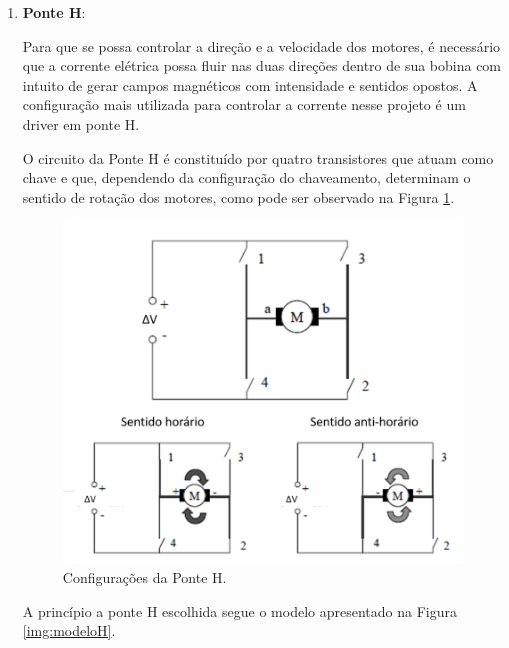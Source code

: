 			\begin{enumerate}
				\item \textbf{Ponte H}:

					Para que se possa controlar a direção e a velocidade dos motores, é necessário que a corrente elétrica possa fluir nas duas direções dentro de sua bobina com intuito de gerar campos magnéticos com intensidade e sentidos opostos. A configuração mais utilizada para controlar a corrente nesse projeto é um driver em ponte H.

					O circuito da Ponte H é constituído por quatro transistores que atuam como chave e que, dependendo da configuração do chaveamento, determinam o sentido de rotação dos motores, como pode ser observado na Figura \ref{img:configH}.

					\begin{figure}[H]
						\centering
						\includegraphics[scale=0.3]{figuras/configH.png}
						\caption{Configurações da Ponte H.}
						\label{img:configH}
					\end{figure}

					A princípio a ponte H escolhida segue o modelo apresentado na Figura \ref{img:modeloH}. 


\end{enumerate}
